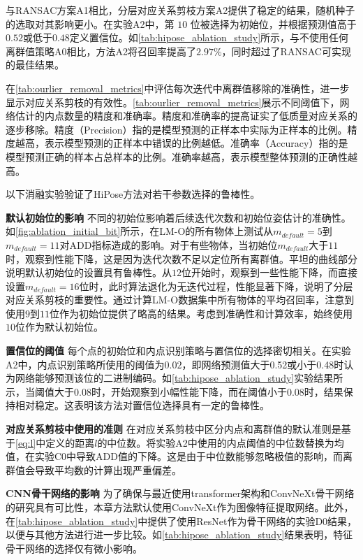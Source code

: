 与RANSAC方案A1相比，分层对应关系剪枝方案A2提供了稳定的结果，随机种子的选取对其影响更小。在实验A2中，第 $10$ 位被选择为初始位，并根据预测值高于$0.52$或低于$0.48$定义置信位。如\autoref{tab:hipose_ablation_study}所示，与不使用任何离群值策略A0相比，方法A2将召回率提高了$2.97\%$，同时超过了RANSAC可实现的最佳结果。

在\autoref{tab:ourlier_removal_metrics}中评估每次迭代中离群值移除的准确性，进一步显示对应关系剪枝的有效性。\autoref{tab:ourlier_removal_metrics}展示不同阈值下，网络估计的内点数量的精度和准确率。精度和准确率的提高证实了低质量对应关系的逐步移除。精度（Precision）指的是模型预测的正样本中实际为正样本的比例。精度越高，表示模型预测的正样本中错误的比例越低。准确率（Accuracy）指的是模型预测正确的样本占总样本的比例。准确率越高，表示模型整体预测的正确性越高。



以下消融实验验证了HiPose方法对若干参数选择的鲁棒性。



\textbf{默认初始位的影响 }
不同的初始位影响着后续迭代次数和初始位姿估计的准确性。如\autoref{fig:ablation_initial_bit}所示，在LM-O的所有物体上测试从$m_{default} = 5$到$m_{default}=11$对ADD指标造成的影响。对于有些物体，当初始位$m_{default}$大于$11$时，观察到性能下降，这是因为迭代次数不足以定位所有离群值。平坦的曲线部分说明默认初始位的设置具有鲁棒性。从$12$位开始时，观察到一些性能下降，而直接设置$m_{default} = 16$位时，此时算法退化为无迭代过程，性能显著下降，说明了分层对应关系剪枝的重要性。通过计算LM-O数据集中所有物体的平均召回率，注意到使用$9$到$11$位作为初始位提供了略高的结果。考虑到准确性和计算效率，始终使用$10$位作为默认初始位。

\textbf{置信位的阈值 }
每个点的初始位和内点识别策略与置信位的选择密切相关。在实验A2中，内点识别策略所使用的阈值为$0.02$，即网络预测值大于0.52或小于0.48时认为网络能够预测该位的二进制编码。如\autoref{tab:hipose_ablation_study}实验结果所示，当阈值大于$0.08$时，开始观察到小幅性能下降，而在阈值小于$0.08$时，结果保持相对稳定。这表明该方法对置信位选择具有一定的鲁棒性。

\textbf{对应关系剪枝中使用的准则 }
在对应关系剪枝中区分内点和离群值的默认准则是基于\autoref{eq:l}中定义的距离$l$的中位数。将实验A2中使用的内点阈值的中位数替换为均值，在实验C0中导致ADD值的下降。这是由于中位数能够忽略极值的影响，而离群值会导致平均数的计算出现严重偏差。

\textbf{CNN骨干网络的影响 }
为了确保与最近使用transformer架构和ConvNeXt\cite{Liu2022ACF}骨干网络的研究具有可比性，本章方法默认使用ConvNeXt作为图像特征提取网络。此外，在\autoref{tab:hipose_ablation_study}中提供了使用ResNet作为骨干网络的实验D0结果，以便与其他方法进行进一步比较。如\autoref{tab:hipose_ablation_study}结果表明，特征骨干网络的选择仅有微小影响。

